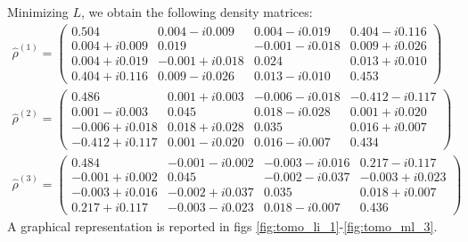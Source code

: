 \documentclass[a4paper, 11pt]{article}
\begin{document}
      Minimizing $L$, we obtain the following density matrices:
      \begin{gather*}
        \hat{\rho}^{(1)} =
        \begin{pmatrix}
          0.504  & 0.004 -i0.009 & 0.004 -i0.019 & 0.404 -i0.116 \\
          0.004 +i0.009 & 0.019  & -0.001 -i0.018 & 0.009 +i0.026 \\
          0.004 +i0.019 & -0.001 +i0.018 & 0.024  & 0.013 +i0.010 \\
          0.404 +i0.116 & 0.009 -i0.026 & 0.013 -i0.010 & 0.453
        \end{pmatrix}
        \\
        \hat{\rho}^{(2)} =
        \begin{pmatrix}
          0.486  & 0.001 +i0.003 & -0.006 -i0.018 & -0.412 -i0.117 \\
          0.001 -i0.003 & 0.045  & 0.018 -i0.028 & 0.001 +i0.020 \\
          -0.006 +i0.018 & 0.018 +i0.028 & 0.035  & 0.016 +i0.007 \\
          -0.412 +i0.117 & 0.001 -i0.020 & 0.016 -i0.007 & 0.434
        \end{pmatrix}
        \\
        \hat{\rho}^{(3)} =
        \begin{pmatrix}
          0.484  & -0.001 -i0.002 & -0.003 -i0.016 & 0.217 -i0.117 \\
          -0.001 +i0.002 & 0.045  & -0.002 -i0.037 & -0.003 +i0.023 \\
          -0.003 +i0.016 & -0.002 +i0.037 & 0.035  & 0.018 +i0.007 \\
          0.217 +i0.117 & -0.003 -i0.023 & 0.018 -i0.007 & 0.436
        \end{pmatrix}
      \end{gather*}
      A graphical representation is reported in figs \ref{fig:tomo_li_1}-\ref{fig:tomo_ml_3}.
\end{document}
